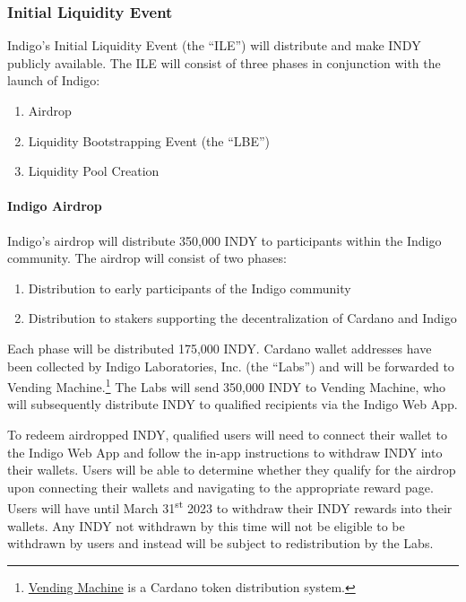 \documentclass{article}
\begin{document}
\begin{sloppypar}
\hypertarget{initial-liquidity-event}{%
\subsubsection{Initial Liquidity Event}\label{initial-liquidity-event}}

Indigo's Initial Liquidity Event (the ``ILE'') will distribute and make
INDY publicly available. The ILE will consist of three phases in
conjunction with the launch of Indigo:

\begin{enumerate}
\item
  Airdrop
\item
  Liquidity Bootstrapping Event (the ``LBE'')
\item
  Liquidity Pool Creation
\end{enumerate}

\hypertarget{indigo-airdrop}{%
\paragraph{Indigo Airdrop}\label{indigo-airdrop}}

Indigo's airdrop will distribute 350,000 INDY to participants within the
Indigo community. The airdrop will consist of two phases:

\begin{enumerate}
\item
  Distribution to early participants of the Indigo community
\item
  Distribution to stakers supporting the decentralization of Cardano and
  Indigo
\end{enumerate}

Each phase will be distributed 175,000 INDY. Cardano wallet addresses
have been collected by Indigo Laboratories, Inc. (the ``Labs'') and will
be forwarded to Vending Machine.\footnote{\href{https://vm.adaseal.eu/about}{Vending
  Machine} is a Cardano token distribution system.} The Labs will send
350,000 INDY to Vending Machine, who will subsequently distribute INDY
to qualified recipients via the Indigo Web App.

To redeem airdropped INDY, qualified users will need to connect their
wallet to the Indigo Web App and follow the in-app instructions to
withdraw INDY into their wallets. Users will be able to determine
whether they qualify for the airdrop upon connecting their wallets and
navigating to the appropriate reward page. Users will have until March
31\textsuperscript{st} 2023 to withdraw their INDY rewards into their
wallets. Any INDY not withdrawn by this time will not be eligible to be
withdrawn by users and instead will be subject to redistribution by the
Labs.


\end{sloppypar}
\end{document}
